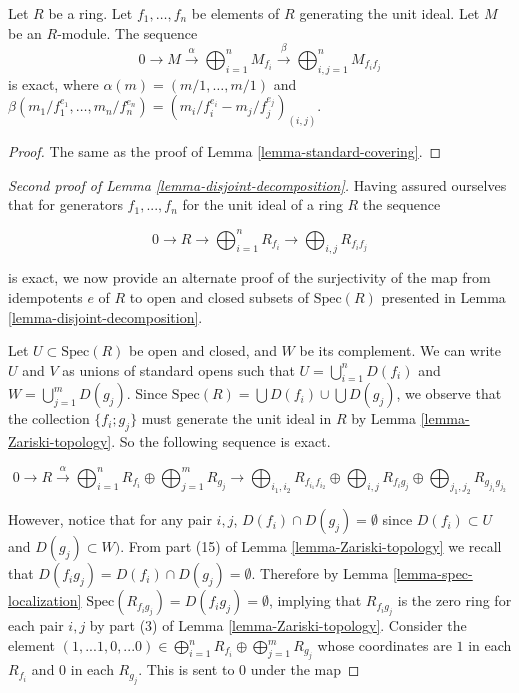 \begin{lemma}
\label{lemma-cover-module}
Let $R$ be a ring. Let $f_1,\ldots, f_n$ be elements of $R$
generating the unit ideal. Let $M$ be an $R$-module.
The sequence
$$
0 \to
M \xrightarrow{\alpha}
\bigoplus\nolimits_{i=1}^n M_{f_i} \xrightarrow{\beta}
\bigoplus\nolimits_{i,j=1}^n M_{f_i f_j}
$$
is exact, where $\alpha(m) = (m/1, \ldots, m/1)$
and $\beta(m_1/f_1^{e_1},\ldots,m_n/f_n^{e_n})
= (m_i/f_i^{e_i} - m_j/f_j^{e_j})_{(i,j)}$.
\end{lemma}

\begin{proof}
The same as the proof of Lemma \ref{lemma-standard-covering}.
\end{proof}

\begin{proof}[Second proof of Lemma \ref{lemma-disjoint-decomposition}]
Having assured ourselves that for generators ${f_1,...,f_n}$ for the unit ideal
of a ring $R$ the sequence

\[
0 \rightarrow R \rightarrow \bigoplus\nolimits_{i=1}^ {n} R_{f_{i}} \rightarrow 
\bigoplus\nolimits_{i,j} R_{f_{i}f_{j}}
\]

\noindent is exact, we now provide an alternate proof of the surjectivity of
the map from idempotents $e$ of $R$ to open and closed subsets of
$\text{Spec}(R)$ 
presented in Lemma \ref{lemma-disjoint-decomposition}.

Let $U \subset \text{Spec}(R)$ be open and closed, and $W$ be its
complement. We can 
write $U$ and $V$ as unions of standard opens such that
$U = \bigcup_{i=1}^{n}  D(f_i)$ and
$W = \bigcup_{j=1}^{m} D(g_j)$.  Since
$\text{Spec}(R) = \bigcup D(f_i) \cup \bigcup D(g_j)$,
we observe that the collection $\{ f_i;g_j\}$ must 
generate the unit ideal in $R$ by Lemma \ref{lemma-Zariski-topology}. 
So the following sequence is exact.

\begin{equation}
\label{idempotent-exact-sequence}
0 \rightarrow R \stackrel{\alpha}{\rightarrow}
\bigoplus\nolimits_{i=1}^ {n} R_{f_{i}}
\oplus \bigoplus\nolimits_{j=1}^{m} R_{g_j}
\rightarrow
\bigoplus\nolimits_{i_1,i_2} R_{f_{i_1}f_{i_2}} 
\oplus \bigoplus\nolimits_{i,j} R_{f_{i}g_{j}}
\oplus \bigoplus\nolimits_{j_1,j_2} R_{g_{j_1}g_{j_2}}
\end{equation}

\noindent
However, notice that for any pair $i,j$,
$D(f_i) \cap D(g_j) = \emptyset$
since $D(f_i) \subset U$ and $D(g_j) \subset W)$. From part (15) 
of Lemma \ref{lemma-Zariski-topology}
we recall that $D(f_i g_j) = D(f_i) \cap D(g_j) = \emptyset$. Therefore by 
Lemma \ref{lemma-spec-localization}
$\text{Spec}(R_{f_i g_j}) = D(f_i g_j) = \emptyset$,
implying that $R_{f_i g_j}$ is the 
zero ring for each pair $i,j$ by part (3) of
Lemma \ref{lemma-Zariski-topology}. 
Consider the element
$(1,...1,0,...0) \in \bigoplus_{i=1}^ {n} R_{f_{i}}
\oplus \bigoplus_{j=1}^{m} R_{g_j}$
whose coordinates are $1$ in each $R_{f_i}$ and 
$0$ in each $R_{g_j}$. This is sent to $0$ under the map 


\end{proof}
